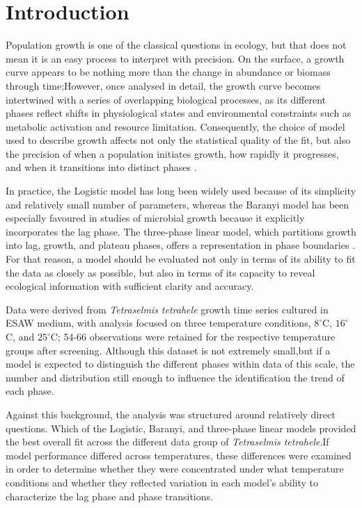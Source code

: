 \documentclass[11pt,onecolumn,draftclsnofoot]{IEEEtran}
\begin{document}
\section{Introduction}
Population growth is one of the classical questions in ecology, but that does not mean it is an easy process to interpret with precision. On the surface, a growth curve appears to be nothing more than the change in abundance or biomass through time;However, once analysed in detail, the growth curve becomes intertwined with a series of overlapping biological processes, as its different phases reflect shifts in physiological states and environmental constraints such as metabolic activation and resource limitation\cite{mbs:/content/journal/micro/10.1099/mic.0.001428}.
Consequently, the choice of model used to describe growth affects not only the statistical quality of the fit, but also the precision of when a population initiates growth, how rapidly it progresses, and when it transitions into distinct phases \cite{LOPEZ2004289}.

In practice, the Logistic model has long been widely used because of its simplicity and relatively small number of parameters, whereas the Baranyi model has been especially favoured in studies of microbial growth because it explicitly incorporates the lag phase. The three-phase linear model, which partitions growth into lag, growth, and plateau phases, offers a representation in phase boundaries \cite{BUCHANAN1997313}. For that reason, a model should be evaluated not only in terms of its ability to fit the data as closely as possible, but also in terms of its capacity to reveal ecological information with sufficient clarity and accuracy.

Data were derived from  \textit{Tetraselmis tetrahele} growth time series cultured in ESAW medium, with analysis focused on three temperature conditions, $8^\circ$C, $16^\circ$C, and $25^\circ$C; 54-66 observations were retained for the respective temperature groups after screening. Although this dataset is not extremely small,but if a model is expected to distinguish the different phases within data of this scale, the number and distribution still enough to influence the identification the trend of each phase.

Against this background, the analysis was structured around relatively direct questions. Which of the Logistic, Baranyi, and three-phase linear models provided the best overall fit across the different data group of \textit{Tetraselmis tetrahele}.If model performance differed across temperatures, these differences were examined in order to determine whether they were concentrated under what temperature conditions and whether they reflected variation in each model's ability to characterize the lag phase and phase transitions.
\end{document}
